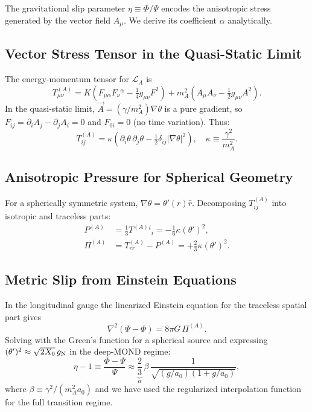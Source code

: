 \documentclass[aps,prd,twocolumn,showpacs,superscriptaddress]{revtex4-2}
\newcommand{\Lbar}{\mathcal{L}}
\newcommand{\aO}{a_0}
\newcommand{\Xzero}{X_0}
\newcommand{\gN}{g_{\rm N}}
\begin{document}
The gravitational slip parameter $\eta \equiv \Phi/\Psi$ encodes the
anisotropic stress generated by the vector field $A_\mu$.
We derive its coefficient $\alpha$ analytically.

\subsection{Vector Stress Tensor in the Quasi-Static Limit}

The energy-momentum tensor for $\Lbar_A$ is
\begin{equation}
  T^{(A)}_{\mu\nu} = K\!\left(F_{\mu\alpha}F_\nu{}^\alpha
    - \tfrac{1}{4}g_{\mu\nu}F^2\right)
    + m_A^2\!\left(A_\mu A_\nu - \tfrac{1}{2}g_{\mu\nu}A^2\right).
\end{equation}
In the quasi-static limit, $\vec{A} = (\gamma/m_A^2)\nabla\theta$ is
a pure gradient, so $F_{ij} = \partial_i A_j - \partial_j A_i = 0$
and $F_{0i} = 0$ (no time variation). Thus:
\begin{equation}
  T^{(A)}_{ij} = \kappa\!\left(
    \partial_i\theta\,\partial_j\theta
    - \tfrac{1}{2}\delta_{ij}|\nabla\theta|^2
  \right),
  \quad \kappa \equiv \frac{\gamma^2}{m_A^2}.
  \label{eq:TAij}
\end{equation}

\subsection{Anisotropic Pressure for Spherical Geometry}

For a spherically symmetric system, $\nabla\theta = \theta'(r)\hat r$.
Decomposing $T^{(A)}_{ij}$ into isotropic and traceless parts:
\begin{align}
  P^{(A)} &= \tfrac{1}{3}T^{(A)}{}^i{}_i = -\tfrac{1}{6}\kappa(\theta')^2, \\
  \Pi^{(A)} &= T^{(A)}_{rr} - P^{(A)}
             = +\tfrac{2}{3}\kappa(\theta')^2.
  \label{eq:Pi}
\end{align}

\subsection{Metric Slip from Einstein Equations}

In the longitudinal gauge the linearized Einstein equation for the
traceless spatial part gives
\begin{equation}
  \nabla^2(\Psi-\Phi) = 8\pi G\,\Pi^{(A)}.
\end{equation}
Solving with the Green's function for a spherical source and expressing
$(\theta')^2 \approx \sqrt{2\Xzero}\,\gN$ in the deep-MOND regime:
\begin{equation}
  \eta - 1 \equiv \frac{\Phi-\Psi}{\Psi}
  \approx \underbrace{\frac{2}{3}}_{\alpha}\,\beta\,
  \frac{1}{\sqrt{(g/\aO)(1+g/\aO)}},
  \label{eq:eta}
\end{equation}
where $\beta \equiv \gamma^2/(m_A^2\aO)$ and we have used the
regularized interpolation function for the full transition regime.
\end{document}
